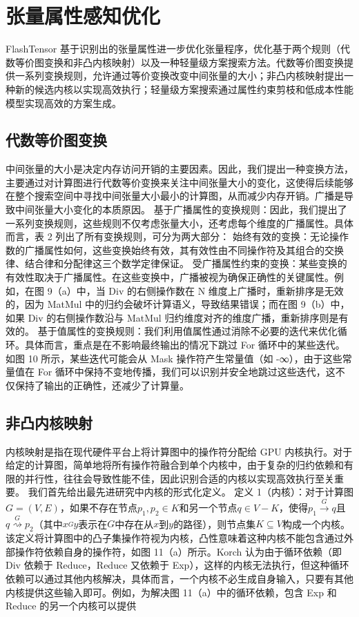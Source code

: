 \section{张量属性感知优化}
FlashTensor 基于识别出的张量属性进一步优化张量程序，优化基于两个规则（代数等价图变换和非凸内核映射）以及一种轻量级方案搜索方法。代数等价图变换提供一系列变换规则，允许通过等价变换改变中间张量的大小；非凸内核映射提出一种新的候选内核以实现高效执行；轻量级方案搜索通过属性约束剪枝和低成本性能模型实现高效的方案生成。
\subsection{代数等价图变换}
中间张量的大小是决定内存访问开销的主要因素。因此，我们提出一种变换方法，主要通过对计算图进行代数等价变换来关注中间张量大小的变化，这使得后续能够在整个搜索空间中寻找中间张量大小最小的计算图，从而减少内存开销。广播是导致中间张量大小变化的本质原因。
基于广播属性的变换规则：因此，我们提出了一系列变换规则，这些规则不仅考虑张量大小，还考虑每个维度的广播属性。具体而言，表 2 列出了所有变换规则，可分为两大部分：
始终有效的变换：无论操作数的广播属性如何，这些变换始终有效，其有效性由不同操作符及其组合的交换律、结合律和分配律这三个数学定律保证。
受广播属性约束的变换：某些变换的有效性取决于广播属性。在这些变换中，广播被视为确保正确性的关键属性。例如，在图 9（a）中，当 Div 的右侧操作数在 N 维度上广播时，重新排序是无效的，因为 MatMul 中的归约会破坏计算语义，导致结果错误；而在图 9（b）中，如果 Div 的右侧操作数沿与 MatMul 归约维度对齐的维度广播，重新排序则是有效的。
基于值属性的变换规则：我们利用值属性通过消除不必要的迭代来优化循环。具体而言，重点是在不影响最终输出的情况下跳过 For 循环中的某些迭代。如图 10 所示，某些迭代可能会从 Mask 操作符产生常量值（如 -∞），由于这些常量值在 For 循环中保持不变地传播，我们可以识别并安全地跳过这些迭代，这不仅保持了输出的正确性，还减少了计算量。
\subsection{非凸内核映射}
内核映射是指在现代硬件平台上将计算图中的操作符分配给 GPU 内核执行。对于给定的计算图，简单地将所有操作符融合到单个内核中，由于复杂的归约依赖和有限的并行性，往往会导致性能不佳，因此识别合适的内核以实现高效执行至关重要。
我们首先给出最先进研究中内核的形式化定义。
定义 1（内核）：对于计算图\(G=(V, E)\)，如果不存在节点\(p_{1}, p_{2} \in K\)和另一个节点\(q \in V - K\)，使得\(p_{1} \stackrel{G}{\to } q\)且\(q \stackrel{G}{\rightsquigarrow} p_{2}\)（其中\(x \stackrel{G}{~} y\)表示在\(G\)中存在从\(x\)到\(y\)的路径），则节点集\(K \subseteq V\)构成一个内核。
该定义将计算图中的凸子集操作符视为内核，凸性意味着这种内核不能包含通过外部操作符依赖自身的操作符，如图 11（a）所示。Korch 认为由于循环依赖（即 Div 依赖于 Reduce，Reduce 又依赖于 Exp），这样的内核无法执行，但这种循环依赖可以通过其他内核解决，具体而言，一个内核不必生成自身输入，只要有其他内核提供这些输入即可。例如，为解决图 11（a）中的循环依赖，包含 Exp 和 Reduce 的另一个内核可以提供


